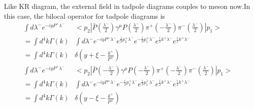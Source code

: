 \documentclass[preprintnumbers,prd,superscriptaddress,preprint]{revtex4-1}
\begin{document}
	Like KR diagram, the external field in tadpole diagrams couples to
	meson now.In this case, the bilocal operator for tadpole diagrams is 
	\begin{align*}
		\int d\lambda^{-}e^{-iyP^{+}\lambda^{-}} & <p_{2}|\bar{P}(\frac{\lambda^{-}}{2})\gamma^{\mu}P(\frac{\lambda^{-}}{2})\pi^{+}(-\frac{\lambda^{-}}{2})\pi^{-}(\frac{\lambda^{-}}{2})|p_{1}>\\
		=\int d^{4}k\Gamma(k) & \int d\lambda^{-}e^{-iyP^{+}\lambda^{-}}e^{\frac{i}{2}p_{2}^{+}\lambda^{-}}e^{-\frac{i}{2}p_{1}^{+}\lambda^{-}}e^{\frac{i}{2}k^{+}\lambda^{-}}e^{\frac{i}{2}k^{+}\lambda^{-}}\\
		=\int d^{4}k\Gamma(k) & \delta(y+\xi-\frac{k^{+}}{P^{+}})\\
		\int d\lambda^{-}e^{-iyP^{+}\lambda^{-}} & <p_{2}|\bar{P}(-\frac{\lambda^{-}}{2})\gamma^{\mu}P(-\frac{\lambda^{-}}{2})\pi^{+}(-\frac{\lambda^{-}}{2})\pi^{-}(\frac{\lambda^{-}}{2})|p_{1}>\\
		=\int d^{4}k\Gamma(k) & \int d\lambda^{-}e^{-iyP^{+}\lambda^{-}}e^{-\frac{i}{2}p_{2}^{+}\lambda^{-}}e^{\frac{i}{2}p_{1}^{+}\lambda^{-}}e^{\frac{i}{2}k^{+}\lambda^{-}}e^{\frac{i}{2}k^{+}\lambda^{-}}\\
		=\int d^{4}k\Gamma(k) & \delta(y-\xi-\frac{k^{+}}{P^{+}})
	\end{align*}
	
\end{document}
